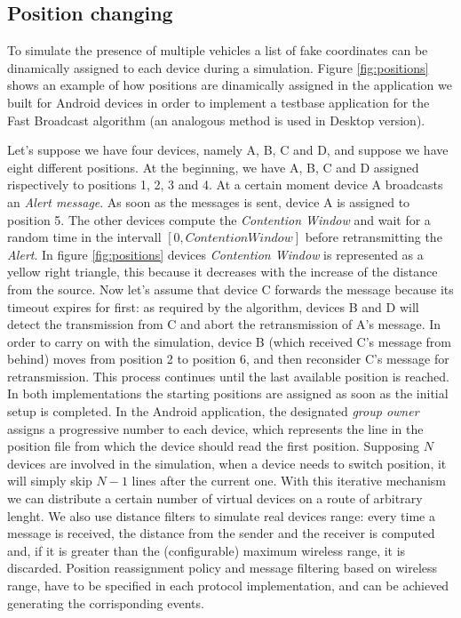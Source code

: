 \subsection{Position changing}
\label{sec:position_change}

To simulate the presence of multiple vehicles a list of fake coordinates can be dinamically assigned to each device during a simulation. Figure \ref{fig:positions} shows an example of how positions are dinamically assigned in the application we built for Android devices in order to implement a testbase application for the Fast Broadcast algorithm (an analogous method is used in Desktop version).

Let's suppose we have four devices, namely A, B, C and D, and suppose we have eight different positions. At the beginning, we have A, B, C and D assigned rispectively to positions 1, 2, 3 and 4. At a certain moment device A broadcasts an \emph{Alert message}. As soon as the messages is sent, device A is assigned to position 5. The other devices compute the \textit{Contention Window} and wait for a random time in the intervall $[0,Contention Window]$ before retransmitting the \emph{Alert}. In figure \ref{fig:positions} devices \textit{Contention Window} is represented as a yellow right triangle, this because it decreases with the increase of the distance from the source. Now let's assume that device C forwards the message because its timeout expires for first: as required by the algorithm, devices B and D will detect the transmission from C and abort the retransmission of A's message. In order to carry on with the simulation, device B (which received C's message from behind) moves from position 2 to position 6, and then reconsider C's message for retransmission. This process continues until the last available position is reached.
In both implementations the starting positions are assigned as soon as the initial setup is completed. In the Android application, the designated \textit{group owner} assigns a progressive number to each device, which represents the line in the position file from which the device should read the first position. Supposing $N$ devices are involved in the simulation, when a device needs to switch position, it will simply skip $N-1$ lines after the current one.
With this iterative mechanism we can distribute a certain number of virtual devices on a route of arbitrary lenght. 
We also use distance filters to simulate real devices range: every time a message is received, the distance from the sender and the receiver is computed and, if it is greater than the (configurable) maximum wireless range, it is discarded.
Position reassignment policy and message filtering based on wireless range, have to be specified in each protocol implementation, and can be achieved generating the corrisponding events.


